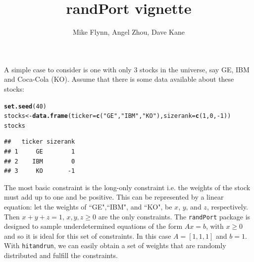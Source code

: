 \documentclass{article}\usepackage{graphicx, color}
\makeatletter
\newcommand{\hlfunctioncall}[1]{\textcolor[rgb]{0.501960784313725,0,0.329411764705882}{\textbf{#1}}}%
\newcommand{\hlstring}[1]{\textcolor[rgb]{0.6,0.6,1}{#1}}%
\newenvironment{kframe}{%
 \def\at@end@of@kframe{}%
 \ifinner\ifhmode%
  \def\at@end@of@kframe{\end{minipage}}%
  \begin{minipage}{\columnwidth}%
 \fi\fi%
 \def\FrameCommand##1{\hskip\@totalleftmargin \hskip-\fboxsep
 \colorbox{shadecolor}{##1}\hskip-\fboxsep
     \hskip-\linewidth \hskip-\@totalleftmargin \hskip\columnwidth}%
 \MakeFramed {\advance\hsize-\width
   \@totalleftmargin\z@ \linewidth\hsize
   \@setminipage}}%
 {\par\unskip\endMakeFramed%
 \at@end@of@kframe}
\newenvironment{knitrout}{}{} %
\makeatother
\begin{document}
\title{randPort vignette}
\author{Mike Flynn, Angel Zhou, Dave Kane}
\maketitle





A simple case to consider is one with only 3 stocks in the universe, say GE, IBM and Coca-Cola (KO). Assume that there is some data available about these stocks:

\begin{knitrout}
\color{fgcolor}\begin{kframe}
\begin{alltt}
\hlfunctioncall{set.seed}(40)
stocks <- \hlfunctioncall{data.frame}(ticker = \hlfunctioncall{c}(\hlstring{"GE"}, \hlstring{"IBM"}, \hlstring{"KO"}), sizerank = \hlfunctioncall{c}(1, 0, -1))
stocks
\end{alltt}
\begin{verbatim}
##   ticker sizerank
## 1     GE        1
## 2    IBM        0
## 3     KO       -1
\end{verbatim}
\end{kframe}
\end{knitrout}


The most basic constraint is the long-only constraint i.e. the weights of the stock must add up to one and be positive. This can be represented by a linear equation: let the weights of ``GE",``IBM", and ``KO", be $x$, $y$, and $z$, respectively. Then $x+y+z =1$, $x,y,z \ge 0$ are the only constraints. The \verb+randPort+ package is designed to sample underdetermined equations of the form $Ax=b$, with $x \ge 0$ and so it is ideal for this set of constraints. In this case $A = [1,1,1]$ and $b = 1$. With \verb+hitandrun+, we can easily obtain a set of weights that are randomly distributed and fulfill the constraints. 
\end{document}
